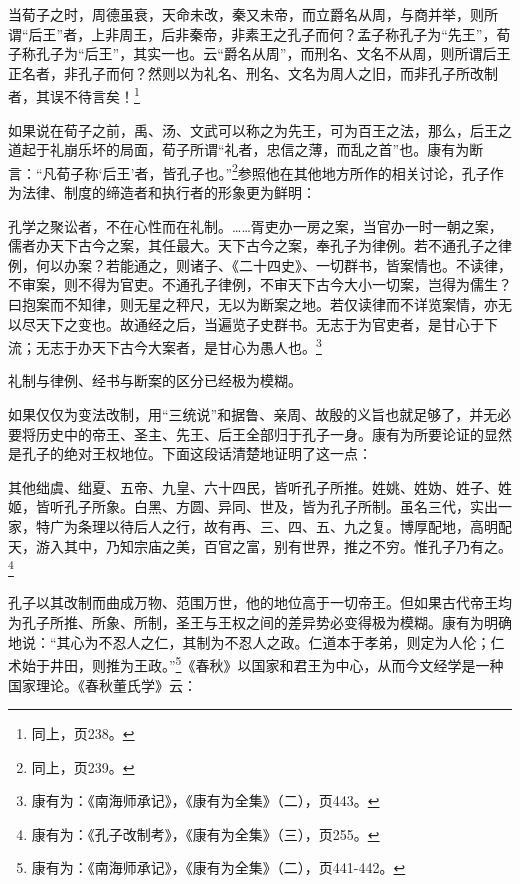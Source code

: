 \documentclass[a4paper, 12pt, openright]{ctexbook}
\renewenvironment{quote}
  {\list{}{\rightmargin2\ccwd \leftmargin2\ccwd \itemindent=2\ccwd \listparindent=2\ccwd}%
   \item\relax\small\kaishu\color{black}}
  {\endlist}
\begin{document}
\begin{quote}
当荀子之时，周德虽衰，天命未改，秦又未帝，而立爵名从周，与商并举，则所谓“后王”者，上非周王，后非秦帝，非素王之孔子而何？孟子称孔子为“先王”，荀子称孔子为“后王”，其实一也。云“爵名从周”，而刑名、文名不从周，则所谓后王正名者，非孔子而何？然则以为礼名、刑名、文名为周人之旧，而非孔子所改制者，其误不待言矣！\footnote{同上，页238。}
\end{quote}

如果说在荀子之前，禹、汤、文武可以称之为先王，可为百王之法，那么，后王之道起于礼崩乐坏的局面，荀子所谓“礼者，忠信之薄，而乱之首”也。康有为断言：“凡荀子称‘后王’者，皆孔子也。”\footnote{同上，页239。}参照他在其他地方所作的相关讨论，孔子作为法律、制度的缔造者和执行者的形象更为鲜明：

\begin{quote}
孔学之聚讼者，不在心性而在礼制。……胥吏办一房之案，当官办一时一朝之案，儒者办天下古今之案，其任最大。天下古今之案，奉孔子为律例。若不通孔子之律例，何以办案？若能通之，则诸子、《二十四史》、一切群书，皆案情也。不读律，不审案，则不得为官吏。不通孔子律例，不审天下古今大小一切案，岂得为儒生？曰抱案而不知律，则无星之秤尺，无以为断案之地。若仅读律而不详览案情，亦无以尽天下之变也。故通经之后，当遍览子史群书。无志于为官吏者，是甘心于下流；无志于办天下古今大案者，是甘心为愚人也。\footnote{康有为：《南海师承记》，《康有为全集》（二），页443。}
\end{quote}

礼制与律例、经书与断案的区分已经极为模糊。

如果仅仅为变法改制，用“三统说”和据鲁、亲周、故殷的义旨也就足够了，并无必要将历史中的帝王、圣主、先王、后王全部归于孔子一身。康有为所要论证的显然是孔子的绝对王权地位。下面这段话清楚地证明了这一点：

\begin{quote}
其他绌虞、绌夏、五帝、九皇、六十四民，皆听孔子所推。姓姚、姓妫、姓子、姓姬，皆听孔子所象。白黑、方圆、异同、世及，皆为孔子所制。虽名三代，实出一家，特广为条理以待后人之行，故有再、三、四、五、九之复。博厚配地，高明配天，游入其中，乃知宗庙之美，百官之富，别有世界，推之不穷。惟孔子乃有之。\footnote{康有为：《孔子改制考》，《康有为全集》（三），页255。}
\end{quote}

孔子以其改制而曲成万物、范围万世，他的地位高于一切帝王。但如果古代帝王均为孔子所推、所象、所制，圣王与王权之间的差异势必变得极为模糊。康有为明确地说：“其心为不忍人之仁，其制为不忍人之政。仁道本于孝弟，则定为人伦；仁术始于井田，则推为王政。”\footnote{康有为：《南海师承记》，《康有为全集》（二），页441-442。}《春秋》以国家和君王为中心，从而今文经学是一种国家理论。《春秋董氏学》云：
\end{document}
